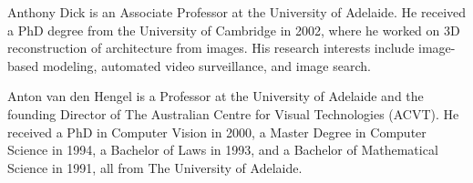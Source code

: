 \documentclass[10pt,journal]{IEEEtran}
\begin{document}
\begin{IEEEbiographynophoto}{Anthony Dick}
	is an Associate Professor at the University of Adelaide. He
	received a PhD degree from the University of Cambridge in 2002, where he worked on 3D reconstruction of architecture from images. His research interests include image-based modeling, automated video surveillance, and image search.
\end{IEEEbiographynophoto}

\begin{IEEEbiographynophoto}{Anton van den Hengel}
	is a Professor at the University of Adelaide and the founding Director of The Australian Centre for Visual Technologies (ACVT). He received a PhD in Computer Vision in 2000, a Master Degree in Computer Science in 1994, a Bachelor of Laws in 1993, and a Bachelor of Mathematical Science in 1991, all from The University of Adelaide.
\end{IEEEbiographynophoto}
\end{document}
